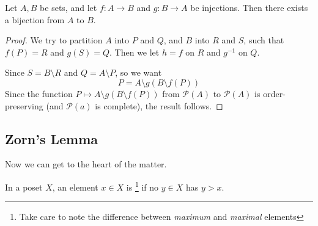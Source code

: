 \documentclass[a4paper, 10pt, twocolumn]{amsart}
\begin{document}
\begin{corollary}
  Let $A, B$ be sets, and let $f: A \rightarrow B$ and $g: B \rightarrow A$ be injections. Then there exists a bijection from $A$ to $B$.
\end{corollary}
\begin{proof}
  We try to partition $A$ into $P$ and $Q$, and $B$ into $R$ and $S$, such that $f(P) = R$ and $g(S) = Q$. Then we let $h = f$ on $R$ and $g^{-1}$ on $Q$.
  \begin{center}
  \end{center}
  Since $S = B\setminus R$ and $Q = A \setminus P$, so we want
  \[
    P = A\setminus g(B\setminus f(P))
  \]
  Since the function $P \mapsto A\setminus g(B\setminus f(P))$ from $\mathcal{P}(A)$ to $\mathcal{P}(A)$ is order-preserving (and $\mathcal{P}(a)$ is complete), the result follows.
\end{proof}

\subsection{Zorn's Lemma}
Now we can get to the heart of the matter.

\begin{definition}
  In a poset $X$, an element $x \in X$ is \footnote{Take care to note the difference between \emph{maximum} and \emph{maximal} elements} if no $y \in X$ has $y > x$.
\end{definition}
\end{document}
